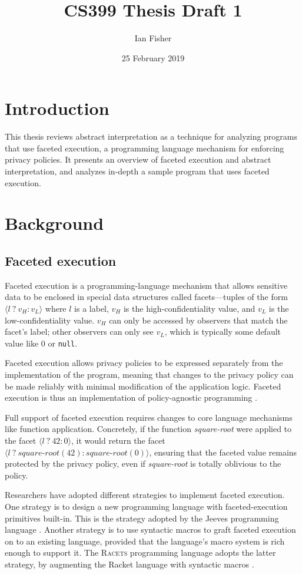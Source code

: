 \documentclass{article}
\title{CS399 Thesis Draft 1}
\author{Ian Fisher}
\date{25 February 2019}
\begin{document}
\maketitle

\section{Introduction}
This thesis reviews abstract interpretation as a technique for analyzing programs that use faceted execution, a programming language mechanism for enforcing privacy policies. It presents an overview of faceted execution and abstract interpretation, and analyzes in-depth a sample program that uses faceted execution.

\section{Background}
\subsection{Faceted execution}
Faceted execution is a programming-language mechanism that allows sensitive data to be enclosed in special data structures called facets---tuples of the form $\langle l\ ?\ v_H : v_L \rangle$ where $l$ is a label, $v_H$ is the high-confidentiality value, and $v_L$ is the low-confidentiality value. $v_H$ can only be accessed by observers that match the facet's label; other observers can only see $v_L$, which is typically some default value like $0$ or \texttt{null}.

Faceted execution allows privacy policies to be expressed separately from the implementation of the program, meaning that changes to the privacy policy can be made reliably with minimal modification of the application logic. Faceted execution is thus an implementation of policy-agnostic programming \cite{faceted}.

Full support of faceted execution requires changes to core language mechanisms like function application. Concretely, if the function \textit{square-root} were applied to the facet $\langle l \ ?\ 42 : 0 \rangle$, it would return the facet $\langle l \ ?\ \textit{square-root}(42) : \textit{square-root}(0) \rangle$, ensuring that the faceted value remains protected by the privacy policy, even if \textit{square-root} is totally oblivious to the policy.

Researchers have adopted different strategies to implement faceted execution. One strategy is to design a new programming language with faceted-execution primitives built-in. This is the strategy adopted by the Jeeves programming language \cite{jeeves}. Another strategy is to use syntactic macros to graft faceted execution on to an existing language, provided that the language's macro system is rich enough to support it. The \textsc{Racets} programming language adopts the latter strategy, by augmenting the Racket language with syntactic macros \cite{racets}.
\end{document}
